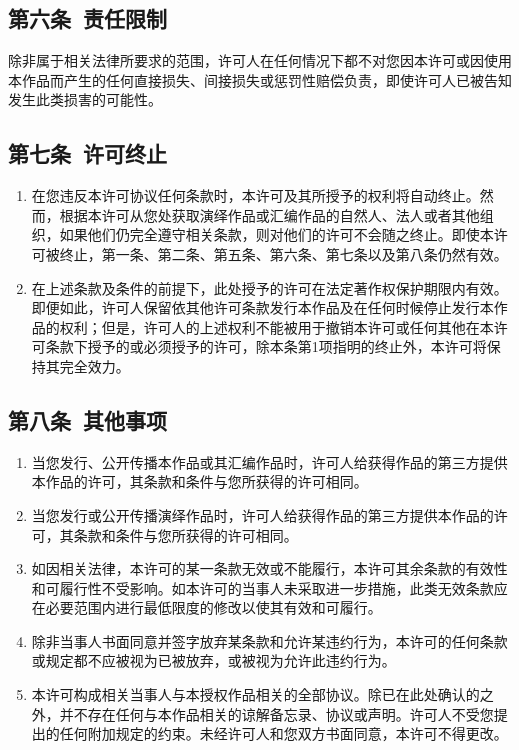 \subsection{第六条\ 责任限制}
除非属于相关法律所要求的范围，许可人在任何情况下都不对您因本许可或因使用本作品而产生的任何直接损失、间接损失或惩罚性赔偿负责，即使许可人已被告知发生此类损害的可能性。 
\subsection{第七条\ 许可终止}
\begin{enumerate}
	\item 在您违反本许可协议任何条款时，本许可及其所授予的权利将自动终止。然而，根据本许可从您处获取演绎作品或汇编作品的自然人、法人或者其他组织，如果他们仍完全遵守相关条款，则对他们的许可不会随之终止。即使本许可被终止，第一条、第二条、第五条、第六条、第七条以及第八条仍然有效。
	\item 在上述条款及条件的前提下，此处授予的许可在法定著作权保护期限内有效。即便如此，许可人保留依其他许可条款发行本作品及在任何时候停止发行本作品的权利；但是，许可人的上述权利不能被用于撤销本许可或任何其他在本许可条款下授予的或必须授予的许可，除本条第1项指明的终止外，本许可将保持其完全效力。
\end{enumerate}
\subsection{第八条\ 其他事项}
\begin{enumerate}
	\item 当您发行、公开传播本作品或其汇编作品时，许可人给获得作品的第三方提供本作品的许可，其条款和条件与您所获得的许可相同。
	\item 当您发行或公开传播演绎作品时，许可人给获得作品的第三方提供本作品的许可，其条款和条件与您所获得的许可相同。
	\item 如因相关法律，本许可的某一条款无效或不能履行，本许可其余条款的有效性和可履行性不受影响。如本许可的当事人未采取进一步措施，此类无效条款应在必要范围内进行最低限度的修改以使其有效和可履行。
	\item 除非当事人书面同意并签字放弃某条款和允许某违约行为，本许可的任何条款或规定都不应被视为已被放弃，或被视为允许此违约行为。
	\item 本许可构成相关当事人与本授权作品相关的全部协议。除已在此处确认的之外，并不存在任何与本作品相关的谅解备忘录、协议或声明。许可人不受您提出的任何附加规定的约束。未经许可人和您双方书面同意，本许可不得更改。
\end{enumerate}
